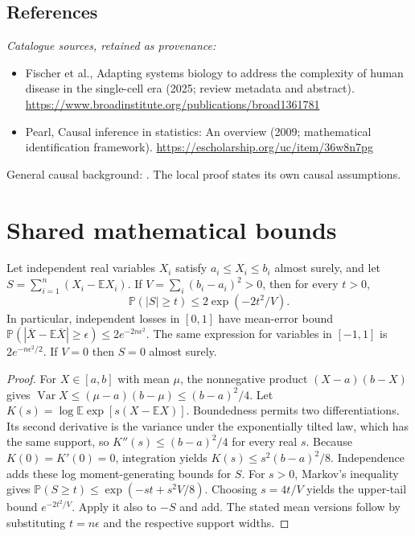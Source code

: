 \documentclass[11pt]{article}
\begin{document}
\subsection{References}
\noindent\emph{Catalogue sources, retained as provenance:}
\begin{itemize}
\item Fischer et al., Adapting systems biology to address the complexity of human disease in the single-cell era (2025; review metadata and abstract). \url{https://www.broadinstitute.org/publications/broad1361781}
\item Pearl, Causal inference in statistics: An overview (2009; mathematical identification framework). \url{https://escholarship.org/uc/item/36w8n7pg}
\end{itemize}
\noindent General causal background: \cite{pearl}. The local proof states its own causal assumptions.




\section{Shared mathematical bounds}\label{app:bounds}
\begin{lemma}\label{lem:bounded}
Let independent real variables $X_i$ satisfy $a_i\leq X_i\leq b_i$ almost surely,
and let $S=\sum_{i=1}^n(X_i-\mathbb{E} X_i)$. If
$V=\sum_i(b_i-a_i)^2>0$, then for every $t>0$,
\[
 \mathbb{P}(|S|\geq t)\leq 2\exp(-2t^2/V).
\]
In particular, independent losses in $[0,1]$ have mean-error bound
$\mathbb{P}(|\overline X-\mathbb{E}\overline X|\geq\epsilon)
\leq2e^{-2n\epsilon^2}$. The same expression for variables in $[-1,1]$
is $2e^{-n\epsilon^2/2}$. If $V=0$ then $S=0$ almost surely.
\end{lemma}
\begin{proof}
For $X\in[a,b]$ with mean $\mu$, the nonnegative product
$(X-a)(b-X)$ gives
$\operatorname{Var} X\leq(\mu-a)(b-\mu)\leq(b-a)^2/4$.
Let $K(s)=\log\mathbb{E}\exp[s(X-\mathbb{E} X)]$.
Boundedness permits two differentiations. Its second derivative is the variance
under the exponentially tilted law, which has the same support, so
$K''(s)\leq(b-a)^2/4$ for every real $s$.
Because $K(0)=K'(0)=0$, integration yields
$K(s)\leq s^2(b-a)^2/8$.
Independence adds these log moment-generating bounds for $S$.
For $s>0$, Markov's inequality gives
$\mathbb{P}(S\geq t)\leq\exp(-st+s^2V/8)$.
Choosing $s=4t/V$ yields the upper-tail bound $e^{-2t^2/V}$.
Apply it also to $-S$ and add. The stated mean versions follow by substituting
$t=n\epsilon$ and the respective support widths.
\end{proof}
\end{document}
